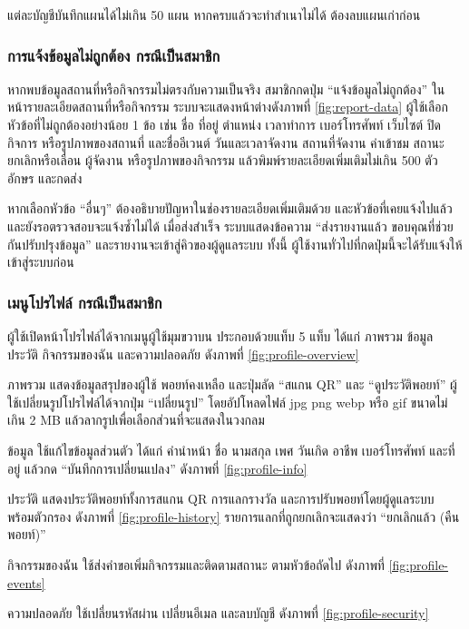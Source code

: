 แต่ละบัญชีบันทึกแผนได้ไม่เกิน 50 แผน หากครบแล้วจะทำสำเนาไม่ได้ ต้องลบแผนเก่าก่อน

\subsubsection{การแจ้งข้อมูลไม่ถูกต้อง กรณีเป็นสมาชิก}

หากพบข้อมูลสถานที่หรือกิจกรรมไม่ตรงกับความเป็นจริง สมาชิกกดปุ่ม ``แจ้งข้อมูลไม่ถูกต้อง'' ในหน้ารายละเอียดสถานที่หรือกิจกรรม ระบบจะแสดงหน้าต่างดังภาพที่ \ref{fig:report-data} ผู้ใช้เลือกหัวข้อที่ไม่ถูกต้องอย่างน้อย 1 ข้อ เช่น ชื่อ ที่อยู่ ตำแหน่ง เวลาทำการ เบอร์โทรศัพท์ เว็บไซต์ ปิดกิจการ หรือรูปภาพของสถานที่ และชื่ออีเวนต์ วันและเวลาจัดงาน สถานที่จัดงาน ค่าเข้าชม สถานะยกเลิกหรือเลื่อน ผู้จัดงาน หรือรูปภาพของกิจกรรม แล้วพิมพ์รายละเอียดเพิ่มเติมไม่เกิน 500 ตัวอักษร และกดส่ง


หากเลือกหัวข้อ ``อื่นๆ'' ต้องอธิบายปัญหาในช่องรายละเอียดเพิ่มเติมด้วย และหัวข้อที่เคยแจ้งไปแล้วและยังรอตรวจสอบจะแจ้งซ้ำไม่ได้ เมื่อส่งสำเร็จ ระบบแสดงข้อความ ``ส่งรายงานแล้ว ขอบคุณที่ช่วยกันปรับปรุงข้อมูล'' และรายงานจะเข้าสู่คิวของผู้ดูแลระบบ ทั้งนี้ ผู้ใช้งานทั่วไปที่กดปุ่มนี้จะได้รับแจ้งให้เข้าสู่ระบบก่อน

\subsubsection{เมนูโปรไฟล์ กรณีเป็นสมาชิก}

ผู้ใช้เปิดหน้าโปรไฟล์ได้จากเมนูผู้ใช้มุมขวาบน ประกอบด้วยแท็บ 5 แท็บ ได้แก่ ภาพรวม ข้อมูล ประวัติ กิจกรรมของฉัน และความปลอดภัย ดังภาพที่ \ref{fig:profile-overview}


\begin{numlist}
\item ภาพรวม แสดงข้อมูลสรุปของผู้ใช้ พอยท์คงเหลือ และปุ่มลัด ``สแกน QR'' และ ``ดูประวัติพอยท์'' ผู้ใช้เปลี่ยนรูปโปรไฟล์ได้จากปุ่ม ``เปลี่ยนรูป'' โดยอัปโหลดไฟล์ jpg png webp หรือ gif ขนาดไม่เกิน 2 MB แล้วลากรูปเพื่อเลือกส่วนที่จะแสดงในวงกลม
\item ข้อมูล ใช้แก้ไขข้อมูลส่วนตัว ได้แก่ คำนำหน้า ชื่อ นามสกุล เพศ วันเกิด อาชีพ เบอร์โทรศัพท์ และที่อยู่ แล้วกด ``บันทึกการเปลี่ยนแปลง'' ดังภาพที่ \ref{fig:profile-info}
\item ประวัติ แสดงประวัติพอยท์ทั้งการสแกน QR การแลกรางวัล และการปรับพอยท์โดยผู้ดูแลระบบ พร้อมตัวกรอง ดังภาพที่ \ref{fig:profile-history} รายการแลกที่ถูกยกเลิกจะแสดงว่า ``ยกเลิกแล้ว (คืนพอยท์)''
\item กิจกรรมของฉัน ใช้ส่งคำขอเพิ่มกิจกรรมและติดตามสถานะ ตามหัวข้อถัดไป ดังภาพที่ \ref{fig:profile-events}
\item ความปลอดภัย ใช้เปลี่ยนรหัสผ่าน เปลี่ยนอีเมล และลบบัญชี ดังภาพที่ \ref{fig:profile-security}
\end{numlist}

